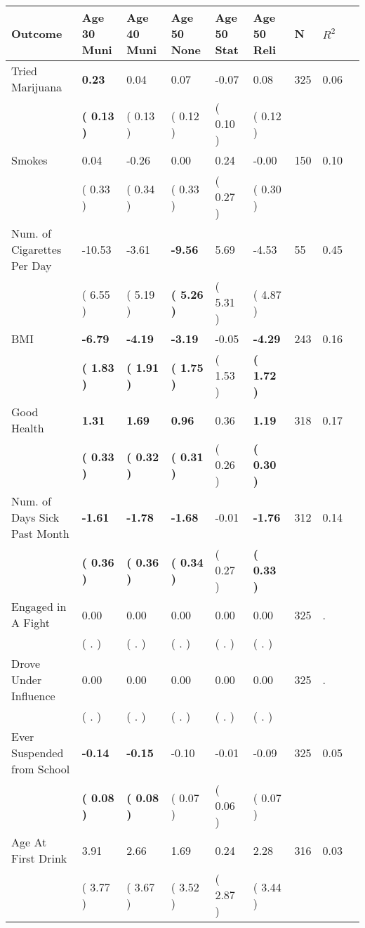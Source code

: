 \begin{tabular}{L{6.2cm} C{1.8cm} C{1.8cm} C{1.8cm} C{1.8cm} C{1.8cm} C{1.8cm} C{0.3cm} C{0.3cm}}
\toprule
 \textbf{Outcome} & \textbf{Age 30 Muni} & \textbf{Age 40 Muni} & \textbf{Age 50 None} & \textbf{Age 50 Stat} & \textbf{Age 50 Reli} & \textbf{N} & \textbf{$ R^2$} \\
\midrule
Tried Marijuana & \textbf{     0.23} &      0.04 &      0.07 &     -0.07 &      0.08  & 325 &       0.06 \\ 
 & \textbf{(     0.13 )} & (     0.13 ) & (     0.12 ) & (     0.10 ) & (     0.12 )  & \\
Smokes &      0.04 &     -0.26 &      0.00 &      0.24 &     -0.00  & 150 &       0.10 \\ 
 & (     0.33 ) & (     0.34 ) & (     0.33 ) & (     0.27 ) & (     0.30 )  & \\
Num. of Cigarettes Per Day &    -10.53 &     -3.61 & \textbf{    -9.56} &      5.69 &     -4.53  & 55 &       0.45 \\ 
 & (     6.55 ) & (     5.19 ) & \textbf{(     5.26 )} & (     5.31 ) & (     4.87 )  & \\
BMI & \textbf{    -6.79} & \textbf{    -4.19} & \textbf{    -3.19} &     -0.05 & \textbf{    -4.29}  & 243 &       0.16 \\ 
 & \textbf{(     1.83 )} & \textbf{(     1.91 )} & \textbf{(     1.75 )} & (     1.53 ) & \textbf{(     1.72 )}  & \\
Good Health & \textbf{     1.31} & \textbf{     1.69} & \textbf{     0.96} &      0.36 & \textbf{     1.19}  & 318 &       0.17 \\ 
 & \textbf{(     0.33 )} & \textbf{(     0.32 )} & \textbf{(     0.31 )} & (     0.26 ) & \textbf{(     0.30 )}  & \\
Num. of Days Sick Past Month & \textbf{    -1.61} & \textbf{    -1.78} & \textbf{    -1.68} &     -0.01 & \textbf{    -1.76}  & 312 &       0.14 \\ 
 & \textbf{(     0.36 )} & \textbf{(     0.36 )} & \textbf{(     0.34 )} & (     0.27 ) & \textbf{(     0.33 )}  & \\
Engaged in A Fight &      0.00 &      0.00 &      0.00 &      0.00 &      0.00  & 325 &          . \\ 
 & (        . ) & (        . ) & (        . ) & (        . ) & (        . )  & \\
Drove Under Influence &      0.00 &      0.00 &      0.00 &      0.00 &      0.00  & 325 &          . \\ 
 & (        . ) & (        . ) & (        . ) & (        . ) & (        . )  & \\
Ever Suspended from School & \textbf{    -0.14} & \textbf{    -0.15} &     -0.10 &     -0.01 &     -0.09  & 325 &       0.05 \\ 
 & \textbf{(     0.08 )} & \textbf{(     0.08 )} & (     0.07 ) & (     0.06 ) & (     0.07 )  & \\
Age At First Drink &      3.91 &      2.66 &      1.69 &      0.24 &      2.28  & 316 &       0.03 \\ 
 & (     3.77 ) & (     3.67 ) & (     3.52 ) & (     2.87 ) & (     3.44 )  & \\
\bottomrule
\end{tabular}

